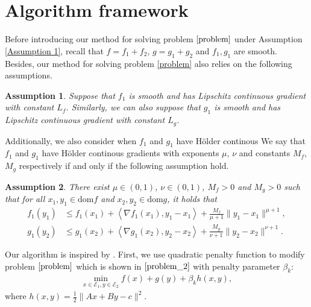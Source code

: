 \documentclass{article}
\numberwithin{equation}{section}
\newtheorem{assumption}{Assumption}[section]
\begin{document}
\section{Algorithm framework }\label{section_convergence_Lipschitz} 
Before introducing our method for solving problem $\eqref{problem}$ under Assumption \ref{Assumption 1}, recall that $f=f_1 + f_2$, 
$g=g_1+g_2$ and  $f_1,g_1$ are smooth. 
Besides, our method for solving problem \eqref{problem} also relies on the following assumptions. 
\begin{assumption} \label{Assumption_Lipschitz_continuity}
    Suppose that $f_1$ is smooth and has Lipschitz continuous gradient with constant $L_f$. Similarly, 
    we can also suppose that $g_1$ is smooth and has Lipschitz continuous gradient with constant $L_g$.
\end{assumption}
Additionally,  we also consider when $f_1$ and $g_1$ have H\"older continous We say that $f_1$ and 
$g_1$ have H\"older continous gradients with exponents $\mu$, $\nu$ and constants $M_f$, $M_g$ respectively if and only if the following assumption hold.
\begin{assumption} \label{Assumption_holder}
   There exist $\mu \in (0,1)$, $\nu\in (0,1)$, $M_f>0$ and $M_g>0$ such that for all $x_1,y_1 \in \mathrm{dom}f$ and 
   $x_2,y_2\in \mathrm{dom}g$, it holds that 
    \begin{align}
        f_1(y_1) &\leq f_1(x_1) + \left\langle \nabla f_1(x_1), y_1-x_1 \right\rangle +\frac{M_f}{\mu +1}
        \|y_1-x_1\rVert^{\mu +1}, \nonumber \\
        g_1(y_2) & \leq g_1(x_2) + \left\langle \nabla g_1(x_2), y_2-x_2 \right\rangle +\frac{M_g}{\nu+1}
        \|y_2-x_2\rVert^{\nu+1}. \label{Holder_property}
    \end{align}
\end{assumption}

Our algorithm is inspired by \cite{yu2020rc}. First, we use quadratic 
penalty function to modify  problem $\eqref{problem}$ which is shown in $\eqref{problem_2}$ 
with penalty parameter $\beta_k$:
\begin{align}
    \min\limits_{x\in \mathcal{E}_1,y \in \mathcal{E}_2} f(x) + g(y) + \beta_k h(x,y),  
    \label{problem_2}
\end{align}
where $h(x,y) = \frac{1}{2}\|Ax+ By-c \rVert^2$.
\end{document}
